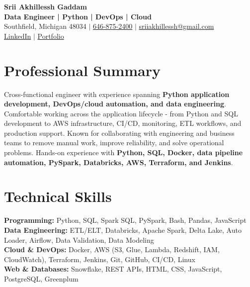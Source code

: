 \documentclass[letterpaper,10pt]{article}
\begin{document}
\fontsize{9.35pt}{10.45pt}\selectfont

\begin{center}
    {\LARGE \textbf{Srii Akhillessh Gaddam}} \\[-1pt]
    \textbf{Data Engineer | Python | DevOps | Cloud} \\[2pt]
    Southfield, Michigan 48034 $|$
    \href{tel:6468752400}{646-875-2400} $|$
    \href{mailto:sriiakhillessh@gmail.com}{sriiakhillessh@gmail.com} \\[1pt]
    \href{https://www.linkedin.com/in/srii-akhiilessh-gaddam-b48668191/}{LinkedIn} $|$
    \href{https://sriiakhillesshg.github.io/portfolio/}{Portfolio}
\end{center}
\vspace{-8pt}

\section{Professional Summary}
\small{Cross-functional engineer with experience spanning \textbf{Python application development, DevOps/cloud automation, and data engineering}. Comfortable working across the application lifecycle - from Python and SQL development to AWS infrastructure, CI/CD, monitoring, ETL workflows, and production support. Known for collaborating with engineering and business teams to remove manual work, improve reliability, and solve operational problems. Hands-on experience with \textbf{Python, SQL, Docker, data pipeline automation, PySpark, Databricks, AWS, Terraform, and Jenkins}.}

\section{Technical Skills}
\small{
\textbf{Programming:} Python, SQL, Spark SQL, PySpark, Bash, Pandas, JavaScript \\
\textbf{Data Engineering:} ETL/ELT, Databricks, Apache Spark, Delta Lake, Auto Loader, Airflow, Data Validation, Data Modeling \\
\textbf{Cloud \& DevOps:} Docker, AWS (S3, Glue, Lambda, Redshift, IAM, CloudWatch), Terraform, Jenkins, Git, GitHub, CI/CD, Linux \\
\textbf{Web \& Databases:} Snowflake, REST APIs, HTML, CSS, JavaScript, PostgreSQL, Greenplum
}

\end{document}
